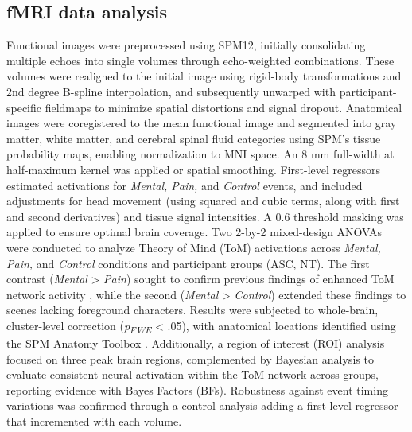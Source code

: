\subsection*{fMRI data analysis}
Functional images were preprocessed using SPM12, initially consolidating multiple echoes into single volumes through echo-weighted combinations. These volumes were realigned to the initial image using rigid-body transformations and 2nd degree B-spline interpolation, and subsequently unwarped with participant-specific fieldmaps to minimize spatial distortions and signal dropout. Anatomical images were coregistered to the mean functional image and segmented into gray matter, white matter, and cerebral spinal fluid categories using SPM's tissue probability maps, enabling normalization to MNI space. An 8 mm full-width at half-maximum kernel was applied or spatial smoothing. First-level regressors estimated activations for \textit{Mental, Pain,} and \textit{Control} events, and included adjustments for head movement (using squared and cubic terms, along with first and second derivatives) and tissue signal intensities. A 0.6 threshold masking was applied to ensure optimal brain coverage.
Two 2-by-2 mixed-design ANOVAs were conducted to analyze Theory of Mind (ToM) activations across \textit{Mental, Pain,} and \textit{Control} conditions and participant groups (ASC, NT). The first contrast (\textit{Mental} > \textit{Pain}) sought to confirm previous findings of enhanced ToM network activity \citep{jacoby2016}, while the second (\textit{Mental} > \textit{Control}) extended these findings to scenes lacking foreground characters. Results were subjected to whole-brain, cluster-level correction (\textit{p\textsubscript{FWE}} < .05), with anatomical locations identified using the SPM Anatomy Toolbox \citep{eickhoff2005}. Additionally, a region of interest (ROI) analysis focused on three peak brain regions, complemented by Bayesian analysis \citep{jasp2022} to evaluate consistent neural activation within the ToM network across groups, reporting evidence with Bayes Factors (BFs). Robustness against event timing variations was confirmed through a control analysis adding a first-level regressor that incremented with each volume.
